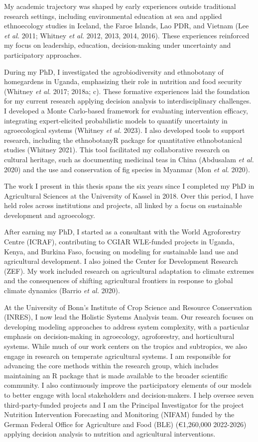 \documentclass[
]{article}
\begin{document}
My academic trajectory was shaped by early experiences outside
traditional research settings, including environmental education at sea
and applied ethnoecology studies in Iceland, the Faroe Islands, Lao PDR,
and Vietnam (Lee \emph{et al.} 2011; Whitney \emph{et al.} 2012, 2013,
2014, 2016). These experiences reinforced my focus on leadership,
education, decision-making under uncertainty and participatory
approaches.

During my PhD, I investigated the agrobiodiversity and ethnobotany of
homegardens in Uganda, emphasizing their role in nutrition and food
security (Whitney \emph{et al.} 2017; 2018a; c). These formative
experiences laid the foundation for my current research applying
decision analysis to interdisciplinary challenges. I developed a Monte
Carlo-based framework for evaluating intervention efficacy, integrating
expert-elicited probabilistic models to quantify uncertainty in
agroecological systems (Whitney \emph{et al.} 2023). I also developed
tools to support research, including the ethnobotanyR package for
quantitative ethnobotanical studies (Whitney 2021). This tool
facilitated my collaborative research on cultural heritage, such as
documenting medicinal teas in China (Abdusalam \emph{et al.} 2020) and
the use and conservation of fig species in Myanmar (Mon \emph{et al.}
2020).

The work I present in this thesis spans the six years since I completed
my PhD in Agricultural Sciences at the University of Kassel in 2018.
Over this period, I have held roles across institutions and projects,
all linked by a focus on sustainable development and agroecology.

After earning my PhD, I started as a consultant with the World
Agroforestry Centre (ICRAF), contributing to CGIAR WLE-funded projects
in Uganda, Kenya, and Burkina Faso, focusing on modeling for sustainable
land use and agricultural development. I also joined the Center for
Development Research (ZEF). My work included research on agricultural
adaptation to climate extremes and the consequences of shifting
agricultural frontiers in response to global climate dynamics (Barrio
\emph{et al.} 2020).

At the University of Bonn's Institute of Crop Science and Resource
Conservation (INRES), I now lead the Holistic Systems Analysis team. Our
research focuses on developing modeling approaches to address system
complexity, with a particular emphasis on decision-making in
agroecology, agroforestry, and horticultural systems. While much of our
work centers on the tropics and subtropics, we also engage in research
on temperate agricultural systems. I am responsible for advancing the
core methods within the research group, which includes maintaining an R
package that is made available to the broader scientific community. I
also continuously improve the participatory elements of our models to
better engage with local stakeholders and decision-makers. I help
oversee seven third-party-funded projects and I am the Principal
Investigator for the project Nutrition Intervention Forecasting and
Monitoring (NIFAM) funded by the German Federal Office for Agriculture
and Food (BLE) (€1,260,000 2022-2026) applying decision analysis to
nutrition and agricultural interventions.
\end{document}
